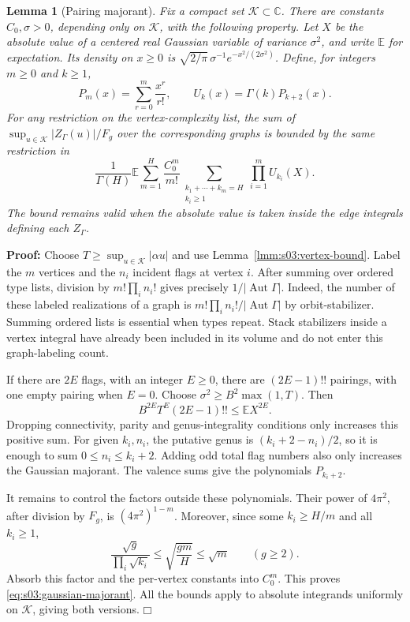 \documentclass[a4paper,10pt]{article}
\numberwithin{equation}{section}
\theoremstyle{paperplain}
\newtheorem{lmm}[thm]{Lemma}
\theoremstyle{paperremark}
\theoremstyle{paperplain}
\newenvironment{prf}{\noindent \textbf{Proof: }}{\hfill $\mdlgwhtsquare$\par\addvspace{0.5\baselineskip}}
\begin{document}
\begin{lmm}[Pairing majorant]
\label{lmm:s03:pairing-majorant}
Fix a compact set $\mathcal K\subset\mathbb C$. There are constants
$C_0,\sigma>0$, depending only on $\mathcal K$, with the following
property. Let $X$ be the absolute value of a centered real Gaussian
variable of variance $\sigma^2$, and write $\mathbb E$ for expectation.
Its density on $x\geq0$ is
$\sqrt{2/\pi}\,\sigma^{-1}e^{-x^2/(2\sigma^2)}$.
Define, for integers $m\geq0$ and $k\geq1$,
\begin{equation}
\label{eq:s03:counting-polynomials}
P_m(x)=\sum_{r=0}^m\frac{x^r}{r!},\qquad
U_k(x)=\Gamma(k)P_{k+2}(x).
\end{equation}
For any restriction on the vertex-complexity list, the sum of
$\sup_{u\in\mathcal K}|Z_\Gamma(u)|/F_g$ over the corresponding
graphs is bounded by the same restriction in
\begin{equation}
\label{eq:s03:gaussian-majorant}
\frac1{\Gamma(H)}\mathbb E
 \sum_{m=1}^H\frac{C_0^m}{m!}
 \sum_{\substack{k_1+\cdots+k_m=H\\k_i\geq1}}
 \prod_{i=1}^m U_{k_i}(X).
\end{equation}
The bound remains valid when the absolute value is taken inside
the edge integrals defining each $Z_\Gamma$.
\end{lmm}
\begin{prf}
Choose $T\geq\sup_{u\in\mathcal K}|\alpha u|$ and use
Lemma~\ref{lmm:s03:vertex-bound}. Label the $m$ vertices and the
$n_i$ incident flags at vertex $i$. After summing over ordered type
lists, division by $m!\prod_i n_i!$ gives precisely
$1/|\operatorname{Aut}\Gamma|$. Indeed, the number of these labeled
realizations of a graph is $m!\prod_i n_i!/|\operatorname{Aut}\Gamma|$
by orbit-stabilizer. Summing ordered lists is essential when types
repeat. Stack stabilizers inside a vertex integral have already been
included in its volume and do not enter this graph-labeling count.

If there are $2E$ flags, with an integer $E\geq0$, there are
$(2E-1)!!$ pairings, with one empty pairing when $E=0$.
Choose $\sigma^2\geq B^2\max(1,T)$. Then
\[
B^{2E}T^E(2E-1)!!\leq\mathbb E X^{2E}.
\]
Dropping connectivity, parity and genus-integrality conditions only
increases this positive sum. For given $k_i,n_i$, the putative genus
is $(k_i+2-n_i)/2$, so it is enough to sum $0\leq n_i\leq k_i+2$.
Adding odd total flag numbers also only increases the Gaussian
majorant. The valence sums give the polynomials $P_{k_i+2}$.

It remains to control the factors outside these polynomials. Their
power of $4\pi^2$, after division by $F_g$, is $(4\pi^2)^{1-m}$.
Moreover, since some $k_i\geq H/m$ and all $k_i\geq1$,
\[
\frac{\sqrt g}{\prod_i\sqrt{k_i}}
\leq\sqrt{\frac{gm}{H}}\leq\sqrt m\qquad(g\geq2).
\]
Absorb this factor and the per-vertex constants into $C_0^m$.
This proves \eqref{eq:s03:gaussian-majorant}. All the bounds apply
to absolute integrands uniformly on $\mathcal K$, giving both versions.
\end{prf}
\end{document}
